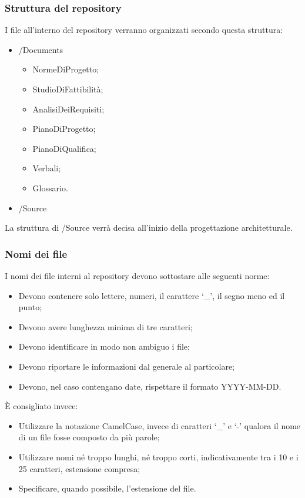 	\subsubsection{Struttura del repository}
	I file all'interno del repository verranno organizzati secondo questa struttura:
	\begin{itemize}
		\item /Documents
		\begin{itemize}
			\item NormeDiProgetto;
			\item StudioDiFattibilità;
			\item AnalisiDeiRequisiti;
			\item PianoDiProgetto;
			\item PianoDiQualifica;
			\item Verbali;
			\item Glossario.
		\end{itemize}
		\item /Source
	\end{itemize}
	La struttura di /Source verrà decisa all'inizio della progettazione architetturale.
	\subsubsection{Nomi dei file}
	I nomi dei file interni al repository devono sottostare alle seguenti norme:
	\begin{itemize}
		\item Devono contenere solo lettere, numeri, il carattere `\_', il segno meno ed il punto;
		\item Devono avere lunghezza minima di tre caratteri;
		\item Devono identificare in modo non ambiguo i file;
		\item Devono riportare le informazioni dal generale al particolare;
		\item Devono, nel caso contengano date, rispettare il formato YYYY-MM-DD.
	\end{itemize}
	È consigliato invece:
	\begin{itemize}
		\item Utilizzare la notazione CamelCase, invece di caratteri `\_' e `-' qualora il nome di un file fosse composto da più parole;
		\item Utilizzare nomi né troppo lunghi, né troppo corti, indicativamente tra i 10 e i 25 caratteri, estensione compresa;
		\item Specificare, quando possibile, l'estensione del file.
	\end{itemize}
